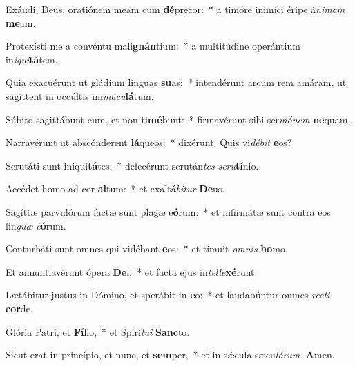 \item Exáudi, Deus, oratiónem meam cum \textbf{dé}precor:~* a timóre inimíci éripe á\textit{ni}\textit{mam} \textbf{me}am.
\item Protexísti me a convéntu mali\textbf{gnán}tium:~* a multitúdine operántium in\textit{i}\textit{qui}\textbf{tá}tem.
\item Quia exacuérunt ut gládium linguas \textbf{su}as:~* intendérunt arcum rem amáram, ut sagíttent in occúltis im\textit{ma}\textit{cu}\textbf{lá}tum.
\item Súbito sagittábunt eum, et non ti\textbf{mé}bunt:~* firmavérunt sibi ser\textit{mó}\textit{nem} \textbf{ne}quam.
\item Narravérunt ut abscónderent \textbf{lá}queos:~* dixérunt: Quis vi\textit{dé}\textit{bit} \textbf{e}os?
\item Scrutáti sunt iniqui\textbf{tá}tes:~* defecérunt scrután\textit{tes} \textit{scru}\textbf{tí}nio.
\item Accédet homo ad cor \textbf{al}tum:~* et exaltá\textit{bi}\textit{tur} \textbf{De}us.
\item Sagíttæ parvulórum factæ sunt plagæ e\textbf{ó}rum:~* et infirmátæ sunt contra eos lin\textit{guæ} \textit{e}\textbf{ó}rum.
\item Conturbáti sunt omnes qui vidébant \textbf{e}os:~* et tímuit \textit{om}\textit{nis} \textbf{ho}mo.
\item Et annuntiavérunt ópera \textbf{De}i,~* et facta ejus in\textit{tel}\textit{le}\textbf{xé}runt.
\item Lætábitur justus in Dómino, et sperábit in \textbf{e}o:~* et laudabúntur omnes \textit{rec}\textit{ti} \textbf{cor}de.
\item Glória Patri, et \textbf{Fí}lio,~* et Spirí\textit{tu}\textit{i} \textbf{Sanc}to.
\item Sicut erat in princípio, et nunc, et \textbf{sem}per,~* et in sǽcula sæcu\textit{ló}\textit{rum}. \textbf{A}men.
